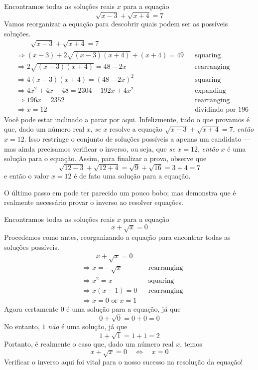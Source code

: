\begin{estratégia}
\begin{example}
\label{exSolveSqrtFirstExample}
Encontramos todas as soluções reais $x$ para a equação
\[
\sqrt{x-3} + \sqrt{x+4} = 7
\]
Vamos reorganizar a equação para descobrir quais podem ser as possíveis soluções.
\begin{align*}
&\phantom{\Rightarrow\;\;} \sqrt{x-3} + \sqrt{x+4} = 7 && \\
&\Rightarrow (x-3) + 2\sqrt{(x-3)(x+4)} + (x+4) = 49 && \text{squaring} \\
&\Rightarrow 2\sqrt{(x-3)(x+4)} = 48-2x && \text{rearranging} \\
&\Rightarrow 4(x-3)(x+4) = (48-2x)^2 && \text{squaring} \\
&\Rightarrow 4x^2+4x-48 = 2304-192x+4x^2 && \text{expanding} \\
&\Rightarrow 196x = 2352 && \text{rearranging} \\
&\Rightarrow x=12 && \text{dividindo por $196$}
\end{align*}
Você pode estar inclinado a parar por aqui. Infelizmente, tudo o que provamos é que, dado um número real $x$, \textit{se} $x$ resolve a equação $\sqrt{x-3} + \sqrt{x+4} = 7$, \textit {então} $x=12$. Isso restringe o conjunto de soluções possíveis a apenas um candidato --- mas ainda precisamos verificar o inverso, ou seja, que \textit{se} $x=12$, \textit{então} $x$ é uma solução para o equação.
Assim, para finalizar a prova, observe que
\[
\sqrt{12-3} + \sqrt{12+4} = \sqrt{9} + \sqrt{16} = 3 + 4 = 7
\]
e então o valor $x=12$ é de fato uma solução para a equação.
\end{example}

O último passo em  pode ter parecido um pouco bobo; mas  demonstra que é realmente necessário provar o inverso ao resolver equações.

\begin{example}
\label{exSolveSqrtSecondExample}
Encontramos todas as soluções reais $x$ para a equação
\[
x+\sqrt{x}=0
\]
Procedemos como antes, reorganizando a equação para encontrar todas as soluções possíveis.
\begin{align*}
&\phantom{\Rightarrow\;\;} x+\sqrt{x} = 0 && \\
&\Rightarrow x=-\sqrt{x} && \text{rearranging} \\
&\Rightarrow x^2=x && \text{squaring} \\
&\Rightarrow x(x-1)=0 && \text{rearranging} \\
&\Rightarrow x=0 \text{ or } x=1 && 
\end{align*}
Agora certamente $0$ é uma solução para a equação, já que
\[
0+\sqrt{0} = 0+0 = 0
\]
No entanto, $1$ \textit{não} é uma solução, já que
\[
1+\sqrt{1} = 1+1 = 2
\]
Portanto, é realmente o caso que, dado um número real $x$, temos
\[
x+\sqrt{x} = 0 \quad \Leftrightarrow \quad x=0
\]
Verificar o inverso aqui foi vital para o nosso sucesso na resolução da equação!
\end{example}


\end{estratégia}
